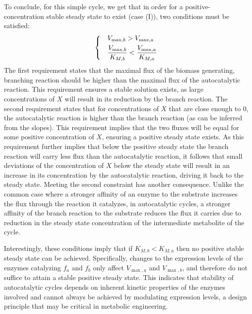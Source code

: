     To conclude, for this simple cycle, we get that in order for a positive-concentration stable steady state to exist (case (I)), two conditions must be satisfied:
    \begin{equation}
    \label{eq:stabconds}
    \begin{dcases}
      & V_{\max,b}>V_{\max,a} \\
      & \frac{V_{\max,b}}{K_{M,b}}<\frac{V_{\max,a}}{K_{M,a}}
    \end{dcases}
    \end{equation}
    The first requirement states that the maximal flux of the biomass generating, branching reaction should be higher than the maximal flux of the autocatalytic reaction.
    This requirement ensures a stable solution exists, as large concentrations of $X$ will result in its reduction by the branch reaction.
    The second requirement states that for concentrations of $X$ that are close enough to $0$, the autocatalytic reaction is higher than the branch reaction (as can be inferred from the slopes).
    This requirement implies that the two fluxes will be equal for some positive concentration of $X$, ensuring a positive steady state exists.
    As this requirement further implies that below the positive steady state the branch reaction will carry less flux than the autocatalytic reaction, it follows that small deviations of the concentration of $X$ below the steady state will result in an increase in its concentration by the autocatalytic reaction, driving it back to the steady state.
    Meeting the second constraint has another consequence.
    Unlike the common case where a stronger affinity of an enzyme to the substrate increases the flux through the reaction it catalyzes, in autocatalytic cycles, a stronger affinity of the branch reaction to the substrate reduces the flux it carries due to reduction in the steady state concentration of the intermediate metabolite of the cycle.

    Interestingly, these conditions imply that if $K_{M,b}<K_{M,a}$ then no positive stable steady state can be achieved.
    Specifically, changes to the expression levels of the enzymes catalyzing $f_a$ and $f_b$ only affect $V_{\max,a}$ and $V_{\max,b}$, and therefore do not suffice to attain a stable positive steady state.
    This indicates that stability of autocatalytic cycles depends on inherent kinetic properties of the enzymes involved and cannot always be achieved by modulating expression levels, a design principle that may be critical in metabolic engineering.

